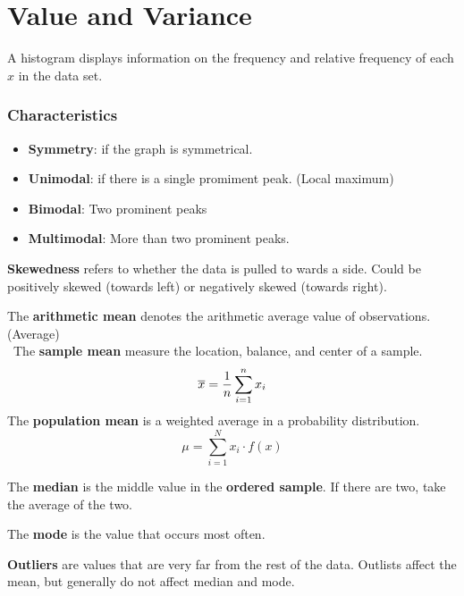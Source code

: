\documentclass[english, 12pt]{article}
\begin{document}

\section{Value and Variance}
\begin{defn}
A histogram displays information on the frequency and relative frequency of each $x$ in the data set.
\end{defn}

\subsubsection*{Characteristics}
\begin{itemize}
\item \textbf{Symmetry}: if the graph is symmetrical.
\item \textbf{Unimodal}: if there is a single promiment peak. (Local maximum)
\item \textbf{Bimodal}: Two prominent peaks
\item \textbf{Multimodal}: More than two prominent peaks.
\end{itemize}

\begin{defn}
\textbf{Skewedness} refers to whether the data is pulled to wards a side. Could be positively skewed (towards left) or negatively skewed (towards right).
\end{defn}

\begin{defn}
The \textbf{arithmetic mean} denotes the arithmetic average value of observations. (Average)\\\
The \textbf{sample mean} measure the location, balance, and center of a sample.
\[\overline{x} = \frac{1}{n} \sum_{i=1}^n x_{i}\]
The \textbf{population mean} is a weighted average in a probability distribution.
\[ \mu = \sum_{i=1}^N x_{i} \cdot f(x)\]
\end{defn}

\begin{defn}
The \textbf{median} is the middle value in the \textbf{ordered sample}. If there are two, take the average of the two.
\end{defn}

\begin{defn}
The \textbf{mode} is the value that occurs most often.
\end{defn}

\begin{defn}
\textbf{Outliers} are values that are very far from the rest of the data. Outlists affect the mean, but generally do not affect median and mode.
\end{defn}
\end{document}
